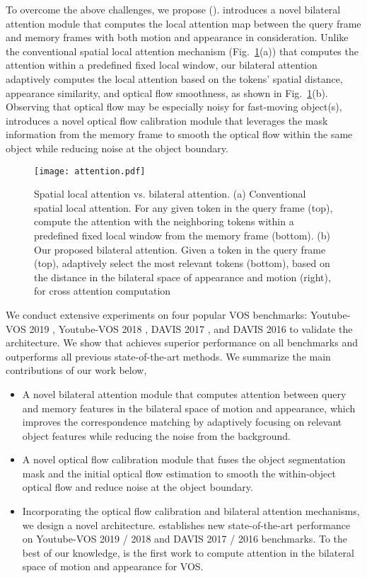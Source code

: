 \documentclass[runningheads]{llncs}
\begin{document}
To overcome the above challenges, we propose {\fullname} (\shortname). {\shortname} introduces a novel bilateral attention module that computes the local attention map between the query frame and memory frames with both motion and appearance in consideration. Unlike the conventional spatial local attention mechanism (Fig.~\ref{fig:attention}(a)) that computes the attention within a predefined fixed local window, our bilateral attention adaptively computes the local attention based on the tokens' spatial distance, appearance similarity, and optical flow smoothness, as shown in Fig.~\ref{fig:attention}(b). Observing that optical flow may be especially noisy for fast-moving object(s),  {\shortname} introduces a novel optical flow calibration module that leverages the mask information from the memory frame to smooth the optical flow within the same object while reducing noise at the object boundary.

\begin{figure}[t]
\centering
\texttt{[image: attention.pdf]}
\caption{Spatial local attention vs. bilateral attention. (a) Conventional spatial local attention. For any given token in the query frame (top), compute the attention with the neighboring tokens within a predefined fixed local window from the memory frame (bottom). (b) Our proposed bilateral attention. Given a token in the query frame (top), adaptively select the most relevant tokens (bottom), based on the distance in the bilateral space of appearance and motion (right), for cross attention computation}
\label{fig:attention}
\end{figure}

We conduct extensive experiments on four popular VOS benchmarks: 
Youtube-VOS 2019 \cite{xu2018youtube}, Youtube-VOS 2018 \cite{xu2018youtube}, DAVIS 2017 \cite{pont20172017}, and DAVIS 2016 \cite{perazzi2016benchmark} to validate the {\shortname} architecture. We show that {\shortname} achieves superior performance on all benchmarks and outperforms all previous state-of-the-art methods. We summarize the main contributions of our work below,


\begin{itemize}
    \item[] A novel bilateral attention module that computes attention between query and memory features in the bilateral space of motion and appearance, which improves the correspondence matching by adaptively focusing on relevant object features while reducing the noise from the background.
    \item[] A novel optical flow calibration module that fuses the object segmentation mask and the initial optical flow estimation to smooth the within-object optical flow and reduce noise at the object boundary.
    \item[] Incorporating the optical flow calibration and bilateral attention mechanisms, we design a novel {\shortname} architecture. {\shortname} establishes new state-of-the-art performance on Youtube-VOS 2019 / 2018 and DAVIS 2017 / 2016 benchmarks. To the best of our knowledge, {\shortname} is the first work to compute attention in the bilateral space of motion and appearance for VOS.
\end{itemize}
\end{document}
